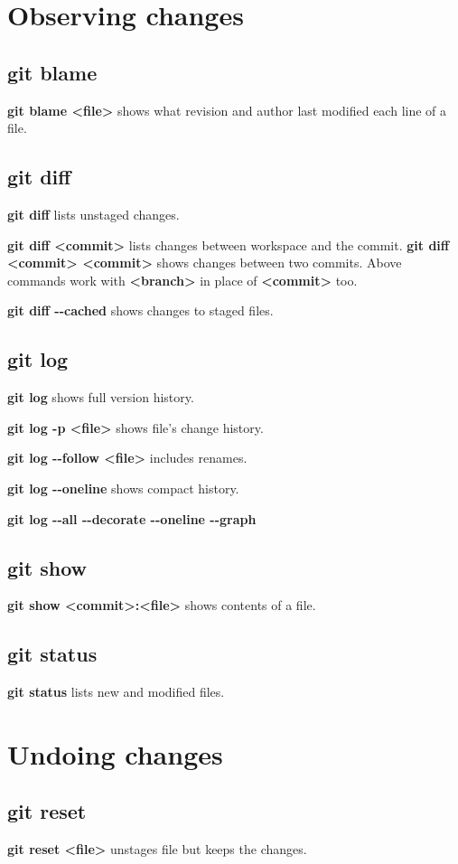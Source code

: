 \documentclass{programmingnotes}
\begin{document}
\begin{multicols*}{3}
\section*{Observing changes}
\subsection*{\dotfill git blame}
\textbf{git blame <file>} shows what revision and author last modified each line of a file.

\subsection*{\dotfill git diff} 
\textbf{git diff} lists unstaged changes.

\textbf{git diff <commit>} lists changes between workspace and the commit.
\textbf{git diff <commit> <commit>} shows changes between two commits.
Above commands work with \textbf{<branch>} in place of \textbf{<commit>} too.

\textbf{git diff -{}-cached} shows changes to staged files.

\subsection*{\dotfill git log}
\textbf{git log} shows full version history.

\textbf{git log -p <file>} shows file's change history.

\textbf{git log -{}-follow <file>} includes renames.

\textbf{git log -{}-oneline} shows compact history.

\textbf{git log -{}-all -{}-decorate -{}-oneline -{}-graph}

\subsection*{\dotfill git show}
\textbf{git show <commit>:<file>} shows contents of a file.

\subsection*{\dotfill git status}
\textbf{git status} lists new and modified files.

\section*{Undoing changes} 
\subsection*{\dotfill git reset}
\textbf{git reset <file>} unstages file but keeps the changes.


\end{multicols*}
\end{document}
